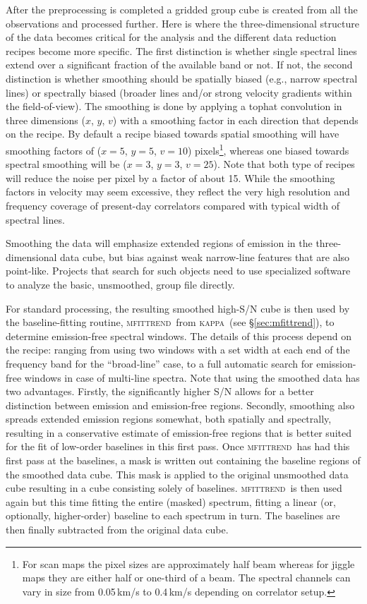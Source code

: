 \documentclass[useAMS,usenatbib]{mn2e}
\newcommand{\KAPPA}{\textsc{kappa}}
\newcommand{\mfittrend}{\textsc{mfittrend}}
\begin{document}
After the preprocessing is completed a gridded group cube is created
from all the observations and processed further. Here is where the
three-dimensional structure of the data becomes critical for the analysis
and the different data reduction recipes become more specific. The first
distinction is whether single spectral lines extend over a significant
fraction of the available band or not. If not, the second distinction
is whether smoothing should be spatially biased (e.g., narrow spectral
lines) or spectrally biased (broader lines and/or strong velocity
gradients within the field-of-view). The smoothing is done by applying
a tophat convolution in three dimensions ($x$, $y$, $v$) with a smoothing
factor in each direction that depends on the recipe.  By default a
recipe biased towards spatial smoothing will have smoothing factors of
($x=5$, $y=5$, $v=10$) pixels\footnote{For scan maps the pixel sizes
  are approximately half beam whereas for jiggle maps they are either
  half or one-third of a beam. The spectral channels can vary in size
  from 0.05\,km/s to 0.4\,km/s depending on correlator setup.},
 whereas one biased towards spectral smoothing
will be ($x=3$, $y=3$, $v=25$). Note that both type of recipes will reduce
the noise per pixel by a factor of about 15. While the smoothing
factors in velocity may seem excessive, they reflect the very high
resolution and frequency coverage of present-day correlators
compared with typical width of spectral lines.

Smoothing the data will emphasize extended regions of emission in the
three-dimensional data cube, but bias against weak narrow-line features that are also
point-like. Projects that search for such objects need to use specialized
software to analyze the basic, unsmoothed, group file directly.

For standard processing, the resulting smoothed high-S/N cube
is then used by the baseline-fitting routine, \mfittrend\ from
\KAPPA\  (see \S\ref{sec:mfittrend}),
to determine emission-free spectral windows.
The details of this process depend on the recipe: ranging from using two
windows with a set width at each end of the frequency band
for the ``broad-line'' case, to a full automatic search for emission-free
windows in case of multi-line spectra. Note that using the smoothed data has
two advantages. Firstly, the significantly higher S/N allows for a better
distinction between emission and emission-free regions. Secondly, smoothing
also spreads extended emission regions somewhat, both spatially and spectrally,
resulting in a conservative estimate of emission-free regions that is better suited for
the fit of low-order baselines in this first pass. Once \mfittrend\ has
had this first pass at the baselines, a mask is written out containing the
baseline regions of the smoothed data cube. This mask is applied to the original
unsmoothed data cube resulting in a cube consisting solely of
baselines. \mfittrend\ is then used again but this time fitting
the entire (masked) spectrum, fitting a linear (or, optionally, higher-order) baseline
to each spectrum in turn. The baselines are then finally subtracted from the
original data cube.
\end{document}
